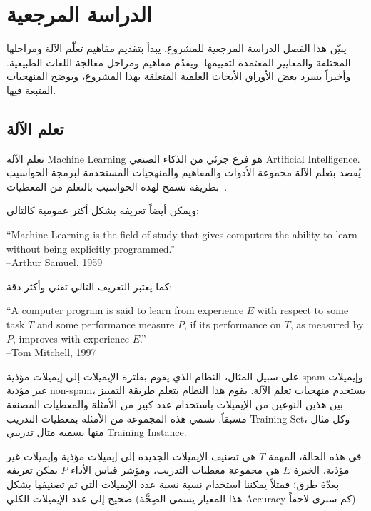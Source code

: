 


\chapter{الدراسة المرجعية}
يبيّن هذا الفصل الدراسة المرجعية للمشروع.
يبدأ بتقديم مفاهيم تعلّم الآلة ومراحلها المختلفة والمعايير المعتمدة لتقييمها.
ويقدّم مفاهيم ومراحل معالجة اللغات الطبيعية.
وأخيراً يسرد بعض الأوراق الأبحاث العلمية المتعلقة بهذا المشروع، ويوضح المنهجيات المتبعة فيها.







\section{تعلم الآلة}
\label{sec:ml}
تعلم الآلة \textenglish{Machine Learning} هو فرع جزئي من الذكاء الصنعي \textenglish{Artificial Intelligence}.
يُقصد بتعلم الآلة مجموعة الأدوات والمفاهيم والمنهجيات المستخدمة لبرمجة الحواسيب
بطريقة تسمح لهذه الحواسيب بالتعلم من المعطيات~\cite{hands-on}.

ويمكن أيضاً تعريفه بشكل أكثر عمومية كالتالي:

\begin{english}
	``Machine Learning is the field of study that gives computers the ability to learn
	without being explicitly programmed.'' \\
	--Arthur Samuel, 1959
\end{english}

كما يعتبر التعريف التالي تقني وأكثر دقة:

\begin{english}
	``A computer program is said to learn from experience $E$ with respect to some task $T$
	and some performance measure $P$, if its performance on $T$, as measured by $P$, improves
	with experience $E$.'' \\
	--Tom Mitchell, 1997
\end{english}

على سبيل المثال، النظام الذي يقوم بفلترة الإيميلات إلى إيميلات مؤذية \textenglish{spam} وإيميلات غير مؤذية \textenglish{non-spam}، يستخدم منهجيات تعلم الآلة.
يقوم هذا النظام بتعلم طريقة التمييز بين هذين النوعين من الإيميلات باستخدام عدد كبير من الأمثلة والمعطيات المصنفة مسبقاً.
نسمي هذه المجموعة من الأمثلة بمعطيات التدريب \textenglish{Training Set}، وكل مثال منها نسميه مثال تدريبي \textenglish{Training Instance}.

في هذه الحالة، المهمة $T$ هي تصنيف الإيميلات الجديدة إلى إيميلات مؤذية وإيميلات غير مؤذية، الخبرة $E$ هي مجموعة معطيات التدريب،
ومؤشر قياس الأداء $P$ يمكن تعريفه بعدّة طرق؛ فمثلاً يمكننا استخدام نسبة نسبة عدد الإيميلات التي تم تصنيفها بشكل صحيح إلى عدد الإيميلات الكلي
(هذا المعيار يسمى الصِحَّة \textenglish{Accuracy} كم سنرى لاحقاً).

